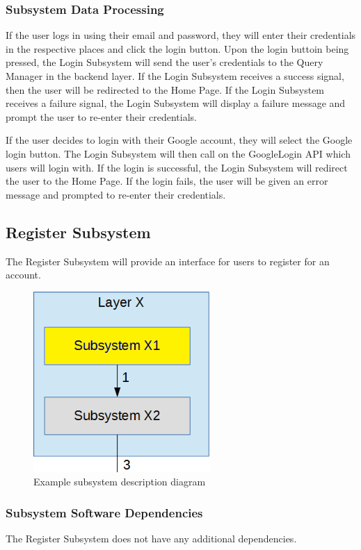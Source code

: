 \subsubsection{Subsystem Data Processing}
If the user logs in using their email and password, they will enter their credentials in the respective places and click the login button. Upon the login buttoin being pressed, the Login Subsystem will send the user's credentials to the Query Manager in the backend layer. If the Login Subsystem receives a success signal, then the user will be redirected to the Home Page. If the Login Subsystem receives a failure signal, the Login Subsystem will display a failure message and prompt the user to re-enter their credentials.

If the user decides to login with their Google account, they will select the Google login button. The Login Subsystem will then call on the GoogleLogin API which users will login with. If the login is successful, the Login Subsystem will redirect the user to the Home Page. If the login fails, the user will be given an error message and prompted to re-enter their credentials.

\subsection{Register Subsystem}
The Register Subsystem will provide an interface for users to register for an account.

\begin{figure}[h!]
	\centering
 	\includegraphics[width=0.60\textwidth]{images/subsystem}
 \caption{Example subsystem description diagram}
\end{figure}

\subsubsection{Subsystem Software Dependencies}
The Register Subsystem does not have any additional dependencies.

